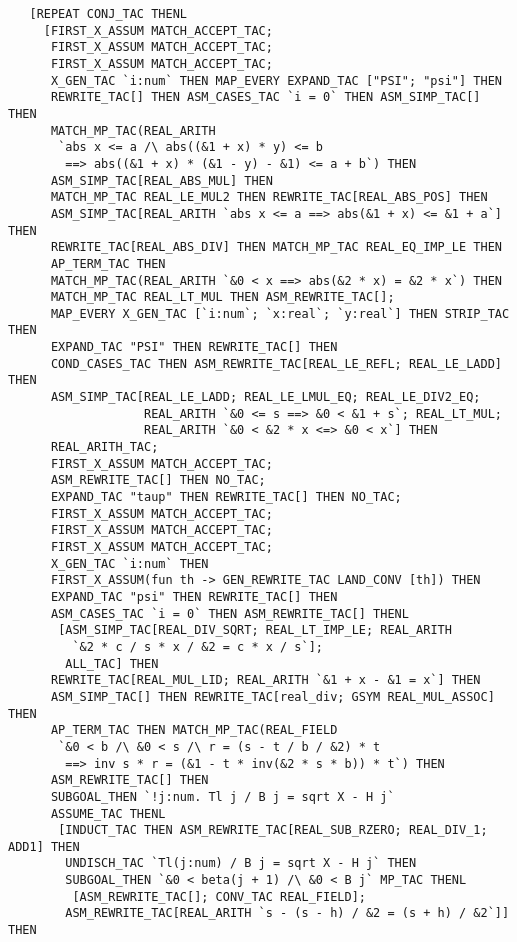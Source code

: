 \documentclass[10pt]{article}
\theoremstyle{definition}
\theoremstyle{remark}
\numberwithin{equation}{section}
\begin{document}
\begin{scriptsize}\begin{verbatim}
   [REPEAT CONJ_TAC THENL
     [FIRST_X_ASSUM MATCH_ACCEPT_TAC;
      FIRST_X_ASSUM MATCH_ACCEPT_TAC;
      FIRST_X_ASSUM MATCH_ACCEPT_TAC;
      X_GEN_TAC `i:num` THEN MAP_EVERY EXPAND_TAC ["PSI"; "psi"] THEN
      REWRITE_TAC[] THEN ASM_CASES_TAC `i = 0` THEN ASM_SIMP_TAC[] THEN
      MATCH_MP_TAC(REAL_ARITH
       `abs x <= a /\ abs((&1 + x) * y) <= b
        ==> abs((&1 + x) * (&1 - y) - &1) <= a + b`) THEN
      ASM_SIMP_TAC[REAL_ABS_MUL] THEN
      MATCH_MP_TAC REAL_LE_MUL2 THEN REWRITE_TAC[REAL_ABS_POS] THEN
      ASM_SIMP_TAC[REAL_ARITH `abs x <= a ==> abs(&1 + x) <= &1 + a`] THEN
      REWRITE_TAC[REAL_ABS_DIV] THEN MATCH_MP_TAC REAL_EQ_IMP_LE THEN
      AP_TERM_TAC THEN
      MATCH_MP_TAC(REAL_ARITH `&0 < x ==> abs(&2 * x) = &2 * x`) THEN
      MATCH_MP_TAC REAL_LT_MUL THEN ASM_REWRITE_TAC[];
      MAP_EVERY X_GEN_TAC [`i:num`; `x:real`; `y:real`] THEN STRIP_TAC THEN
      EXPAND_TAC "PSI" THEN REWRITE_TAC[] THEN
      COND_CASES_TAC THEN ASM_REWRITE_TAC[REAL_LE_REFL; REAL_LE_LADD] THEN
      ASM_SIMP_TAC[REAL_LE_LADD; REAL_LE_LMUL_EQ; REAL_LE_DIV2_EQ;
                   REAL_ARITH `&0 <= s ==> &0 < &1 + s`; REAL_LT_MUL;
                   REAL_ARITH `&0 < &2 * x <=> &0 < x`] THEN
      REAL_ARITH_TAC;
      FIRST_X_ASSUM MATCH_ACCEPT_TAC;
      ASM_REWRITE_TAC[] THEN NO_TAC;
      EXPAND_TAC "taup" THEN REWRITE_TAC[] THEN NO_TAC;
      FIRST_X_ASSUM MATCH_ACCEPT_TAC;
      FIRST_X_ASSUM MATCH_ACCEPT_TAC;
      FIRST_X_ASSUM MATCH_ACCEPT_TAC;
      X_GEN_TAC `i:num` THEN
      FIRST_X_ASSUM(fun th -> GEN_REWRITE_TAC LAND_CONV [th]) THEN
      EXPAND_TAC "psi" THEN REWRITE_TAC[] THEN
      ASM_CASES_TAC `i = 0` THEN ASM_REWRITE_TAC[] THENL
       [ASM_SIMP_TAC[REAL_DIV_SQRT; REAL_LT_IMP_LE; REAL_ARITH
         `&2 * c / s * x / &2 = c * x / s`];
        ALL_TAC] THEN
      REWRITE_TAC[REAL_MUL_LID; REAL_ARITH `&1 + x - &1 = x`] THEN
      ASM_SIMP_TAC[] THEN REWRITE_TAC[real_div; GSYM REAL_MUL_ASSOC] THEN
      AP_TERM_TAC THEN MATCH_MP_TAC(REAL_FIELD
       `&0 < b /\ &0 < s /\ r = (s - t / b / &2) * t
        ==> inv s * r = (&1 - t * inv(&2 * s * b)) * t`) THEN
      ASM_REWRITE_TAC[] THEN
      SUBGOAL_THEN `!j:num. Tl j / B j = sqrt X - H j`
      ASSUME_TAC THENL
       [INDUCT_TAC THEN ASM_REWRITE_TAC[REAL_SUB_RZERO; REAL_DIV_1; ADD1] THEN
        UNDISCH_TAC `Tl(j:num) / B j = sqrt X - H j` THEN
        SUBGOAL_THEN `&0 < beta(j + 1) /\ &0 < B j` MP_TAC THENL
         [ASM_REWRITE_TAC[]; CONV_TAC REAL_FIELD];
        ASM_REWRITE_TAC[REAL_ARITH `s - (s - h) / &2 = (s + h) / &2`]] THEN

\end{verbatim}
\end{scriptsize}
\end{document}
